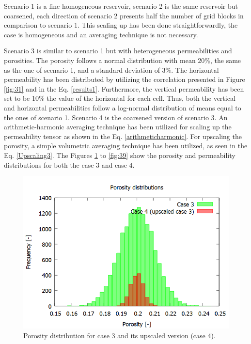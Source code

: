 
Scenario 1 is a fine homogeneous reservoir, scenario 2 is the same reservoir but coarsened, each direction of scenario 2 presents half the number of grid blocks in comparison to scenario 1. This scaling up has been done straightforwardly, the case is homogeneous and an averaging technique is not necessary. 

Scenario 3 is similar to scenario 1 but with heterogeneous permeabilities and porosities. The porosity follows a normal distribution with mean  20\%, the same as the one of scenario 1, and a standard deviation of 3\%. The horizontal permeability has been distributed by utilizing the correlation presented in Figure \ref{fig:31} and in the Eq. \ref{results1}. Furthermore, the vertical permeability has been set to be 10\% the value of the horizontal for each cell. Thus, both the vertical and horizontal permeabilities follow a log-normal distribution of means equal to the ones of scenario 1. Scenario 4 is the coarsened version of scenario 3. An arithmetic-harmonic averaging technique has been utilized for scaling up the permeability tensor as shown in the Eq. \ref{arithmeticharmonic}. For upscaling the porosity, a simple volumetric averaging technique has been utilized, as seen in the Eq. \ref{Upscaling3}. The Figures \ref{fig:37} to \ref{fig:39} show the porosity and permeability distributions for both the case 3 and case 4.

\begin{figure}[H]
	\centering
	\includegraphics[width=0.8\linewidth]{Images/37}
	\caption{Porosity distribution for case 3 and its upscaled version (case 4).}
	\label{fig:37}
\end{figure}

